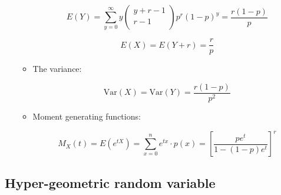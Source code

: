 \documentclass[12pt]{report}
\renewcommand{\_}{\kern-1.5pt\textunderscore\kern-1.5pt}
\begin{document}
\begin{itemize}
\begin{itemize}
 \[ E \left( Y \right) = \sum _{y=0}^{\infty}y \left( \begin{matrix}
y+r-1\\
r-1\\
\end{matrix}
 \right) p^{r} \left( 1-p \right) ^{y}=\frac{r \left( 1-p \right) }{p} \] \par

 \[ E \left( X \right) =E \left( Y+r \right) =\frac{r}{p} \] \par

	\item The variance:\par

 \[ \mathrm{Var} \left( X \right) =\mathrm{Var} \left( Y \right) =\frac{r \left( 1-p \right) }{p^{2}} \] \par

	\item Moment generating functions:\par

 \[ M_{X} \left( t \right) =E \left( e^{tX} \right) = \sum _{x=0}^{n}e^{tx} \cdot p \left( x \right) = \left[ \frac{pe^{t}}{1- \left( 1-p \right) e^{t}} \right] ^{r} \] \par


\end{itemize}
\end{itemize}\subsection*{Hyper-geometric random variable}
\end{document}

